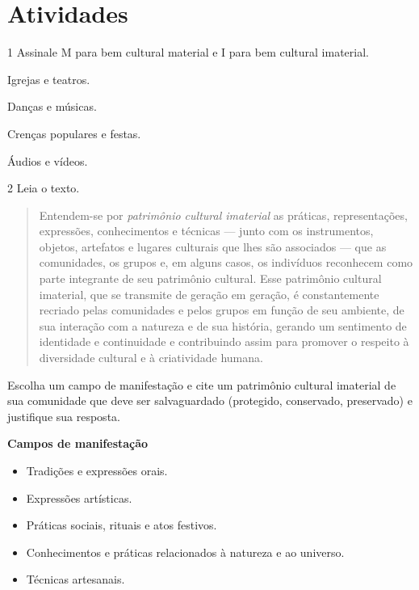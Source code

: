 \section{Atividades}

\num{1} Assinale M para bem cultural material e I para bem cultural imaterial.

\begin{boxlist}
 Igrejas e teatros. 

 Danças e músicas. 

 Crenças populares e festas. 

 Áudios e vídeos. 
\end{boxlist}

\num{2}  Leia o texto.

\begin{quote}
Entendem-se por \emph{patrimônio cultural imaterial} as práticas,
representações, expressões, conhecimentos e técnicas --- junto com os
instrumentos, objetos, artefatos e lugares culturais que lhes são
associados --- que as comunidades, os grupos e, em alguns casos, os
indivíduos reconhecem como parte integrante de seu patrimônio cultural.
Esse patrimônio cultural imaterial, que se transmite de geração em
geração, é constantemente recriado pelas comunidades e pelos grupos em função
de seu ambiente, de sua interação com a natureza e de sua história,
gerando um sentimento de identidade e continuidade e contribuindo assim
para promover o respeito à diversidade cultural e à criatividade humana.

\end{quote}

Escolha um campo de manifestação e cite um patrimônio cultural imaterial
de sua comunidade que deve ser salvaguardado (protegido, conservado,
preservado) e justifique sua resposta.

\textbf{Campos de manifestação}

\begin{itemize}
\item Tradições e expressões orais.

\item Expressões artísticas.

\item Práticas sociais, rituais e atos festivos.

\item Conhecimentos e práticas relacionados à natureza e ao universo.

\item Técnicas artesanais.
\end{itemize}

